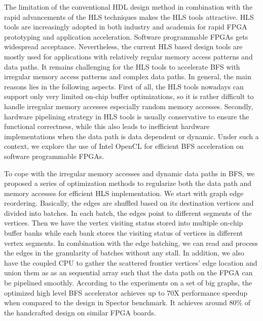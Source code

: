 The limitation of the conventional HDL design method in combination with the 
rapid advancements of the HLS techniques makes the HLS tools attractive. 
HLS tools are increasingly adopted in both industry and academia for rapid FPGA prototyping and 
application acceleration. Software programmable FPGAs \cite{koch2016fpgas, xilinx-sdaccel} 
gets widespread acceptance. Nevertheless, the current HLS based design tools are mostly used for 
applications with relatively regular memory access patterns and data paths. 
It remains challenging for the HLS tools to accelerate BFS with irregular 
memory access patterns and complex data paths. In general, the main reasons lies in the 
following aspects. First of all, the HLS tools nowadays can support only very limited 
on-chip buffer optimizations, so it is rather difficult to handle irregular memory accesses 
especially random memory accesses. Secondly, hardware pipelining strategy in HLS tools 
is usually conservative to ensure the functional correctness, while 
this also leads to inefficient hardware implementations when the data path is data 
dependent or dynamic. Under such a context, we explore the use of Intel OpenCL for 
efficient BFS acceleration on software programmable FPGAs.

To cope with the irregular memory accesses and dynamic data paths in BFS, we proposed 
a series of optimization methods to regularize 
both the data path and memory accesses for efficient HLS implementation. 
We start with graph edge reordering. Basically, the edges 
are shuffled based on its destination vertices and divided into batches. In each batch, 
the edges point to different segments of the vertices. Then we have the vertex visiting 
status stored into multiple on-chip buffer banks while each bank stores the visiting status 
of vertices in different vertex segments. In combination with the edge batching, we can read 
and process the edges in the granularity of batches without any stall. In addition, we also have 
the coupled CPU to gather the scattered frontier vertices' edge location and union them as 
as an sequential array such that the data path on the FPGA can be pipelined smoothly. 
According to the experiments on a set of big graphs, the optimized high level BFS 
accelerator achieves up to 70X performance speedup when compared to the design 
in Spector benchmark. It achieves around 80\% of the handcrafted design on 
similar FPGA boards. 

